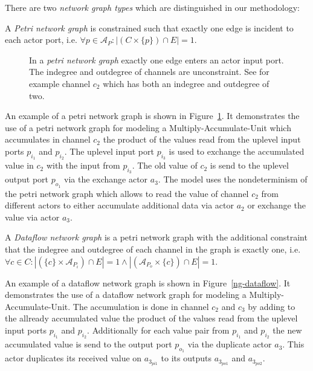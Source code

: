 There are two \emph{network graph types} which are distinguished in our methodology:

\begin{definition}\label{petri-network-graph}
  A \emph{Petri network graph} is constrained such that exactly
  one edge is incident to each actor port, i.e.
  $\forall{p \in \mathcal{A}_{P}}: |(C \times \{p\}) \cap E| = 1$.
\end{definition}

\begin{figure}
\centering

\caption{\label{ng-petri}In a \emph{petri network graph} exactly
  one edge enters an actor input port. The
  indegree and outdegree of channels are
  unconstraint. See for example channel $c_2$
  which has both an indegree and outdegree of
  two.}
\end{figure}

  An example of a petri network graph is shown in Figure~\ref{ng-petri}.
  It demonstrates the use of a petri network graph for modeling
  a Multiply-Accumulate-Unit which accumulates in channel $c_2$ the product of
  the values read from the uplevel input ports $p_{i_1}$ and $p_{i_2}$.
  The uplevel input port $p_{i_3}$ is used to exchange the
  accumulated value in $c_2$ with the input from $p_{i_3}$. The
  old value of $c_2$ is send to the uplevel output port $p_{o_1}$
  via the exchange actor $a_3$. The model uses the nondeterminism
  of the petri network graph which allows to read the value of channel
  $c_2$ from different actors to either accumulate additional
  data via actor $a_2$ or exchange the value via actor $a_3$.

\begin{definition}\label{dataflow-network-graph}
  A \emph{Dataflow network graph} is a petri network graph with the additional constraint
  that the indegree and outdegree of each channel in the graph is exactly one, i.e.
  $\forall{c \in C}: |(\{c\} \times \mathcal{A}_{P_{i}}) \cap E| = 1 \wedge
                    |(\mathcal{A}_{P_{o}} \times \{c\}) \cap E| = 1$.
\end{definition}

  An example of a dataflow network graph is shown in Figure~\ref{ng-dataflow}.
  It demonstrates the use of a dataflow network graph for modeling
  a Multiply-Accumulate-Unit. The accumulation is done in channel $c_2$ and $c_3$
  by adding to the allready accumulated value the product of
  the values read from the uplevel input ports $p_{i_1}$ and $p_{i_2}$.
  Additionally for each value pair from $p_{i_1}$ and $p_{i_2}$ the
  new accumulated value is send to the output port $p_{o_1}$ via
  the duplicate actor $a_3$. This actor duplicates its received
  value on $a_{3_{pi1}}$ to its outputs $a_{3_{po1}}$ and $a_{3_{po2}}$.

